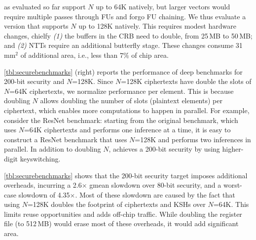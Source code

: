 \name as evaluated so far support $N$ up to 64K natively,
but larger vectors would require multiple passes through FUs and forgo FU chaining.
We thus evaluate a \name version that supports $N$ up to 128K natively.
This requires modest hardware changes, chielfy \emph{(1)}
the buffers in the CRB need to double, from 25$\,$MB to 50$\,$MB; and \emph{(2)}
NTTs require an additional butterfly stage.
These changes consume 31$\,$mm$^2$ of additional area,
i.e., less than $7\%$ of chip area.

\autoref{tbl:securebenchmarks} (right) reports the performance of deep benchmarks
for 200-bit security and $N$=128K.
Since
$N$=128K ciphertexts have double the slots of $N$=64K ciphertexts, we normalize
performance per element. This is because doubling $N$ allows doubling the number of slots (plaintext elements) per ciphertext,
which enables more computations to happen in parallel.
For example, consider the ResNet benchmark: starting from the original benchmark, which uses $N$=64K ciphertexts and performs one inference at a time,
it is easy to construct a ResNet benchmark that uses $N$=128K and performs two inferences in parallel.
In addition to doubling $N$, \name achieves a 200-bit security by using higher-digit keyswitching.

\autoref{tbl:securebenchmarks} shows that the 200-bit security target imposes 
additional overheads, incurring a 2.6$\times$ gmean slowdown over 80-bit security,
and a worst-case slowdown of 4.35$\times$.
Most of these slowdown are caused by the fact that
using $N$=128K doubles the footprint of ciphertexts and KSHs over $N$=64K.
This limits reuse opportunities and adds off-chip traffic.
While doubling the register file (to 512\,MB) would erase most of these overheads,
it would add significant area.

